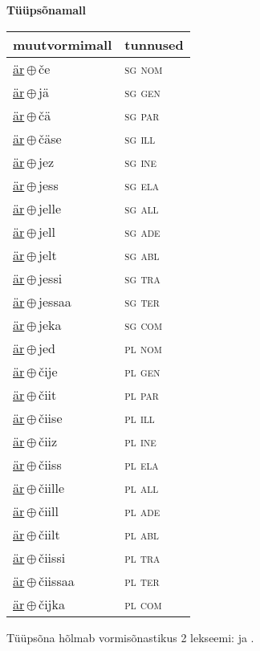 

\vspace{3.5em}
\noindent \begin{minipage}{\textwidth}
\noindent \textbf{Tüüpsõnamall \,}\\

\begin{sideways}
\begin{tabular}{l l}
muutvormimall & tunnused \\
\hline
\underline{är}\,$\oplus$\,če & \textsc{ sg nom } \\
\underline{är}\,$\oplus$\,jä & \textsc{ sg gen } \\
\underline{är}\,$\oplus$\,čä & \textsc{ sg par } \\
\underline{är}\,$\oplus$\,čäse & \textsc{ sg ill } \\
\underline{är}\,$\oplus$\,jez & \textsc{ sg ine } \\
\underline{är}\,$\oplus$\,jess & \textsc{ sg ela } \\
\underline{är}\,$\oplus$\,jelle & \textsc{ sg all } \\
\underline{är}\,$\oplus$\,jell & \textsc{ sg ade } \\
\underline{är}\,$\oplus$\,jelt & \textsc{ sg abl } \\
\underline{är}\,$\oplus$\,jessi & \textsc{ sg tra } \\
\underline{är}\,$\oplus$\,jessaa & \textsc{ sg ter } \\
\underline{är}\,$\oplus$\,jeka & \textsc{ sg com } \\
\underline{är}\,$\oplus$\,jed & \textsc{ pl nom } \\
\underline{är}\,$\oplus$\,čije & \textsc{ pl gen } \\
\underline{är}\,$\oplus$\,čiit & \textsc{ pl par } \\
\underline{är}\,$\oplus$\,čiise & \textsc{ pl ill } \\
\underline{är}\,$\oplus$\,čiiz & \textsc{ pl ine } \\
\underline{är}\,$\oplus$\,čiiss & \textsc{ pl ela } \\
\underline{är}\,$\oplus$\,čiille & \textsc{ pl all } \\
\underline{är}\,$\oplus$\,čiill & \textsc{ pl ade } \\
\underline{är}\,$\oplus$\,čiilt & \textsc{ pl abl } \\
\underline{är}\,$\oplus$\,čiissi & \textsc{ pl tra } \\
\underline{är}\,$\oplus$\,čiissaa & \textsc{ pl ter } \\
\underline{är}\,$\oplus$\,čijka & \textsc{ pl com } \\
\end{tabular}
\end{sideways}
\label{tab:tüüpsõnamall-ärče}

\end{minipage}

 
\vspace{1em}
\noindent Tüüpsõna hõlmab vormisõnastikus 2 lekseemi:  ja .
